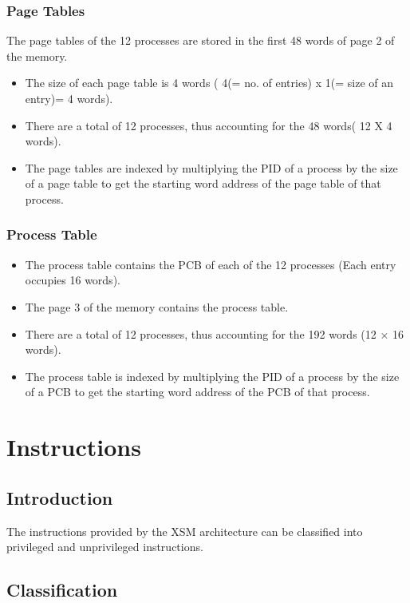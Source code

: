 \documentclass[11pt]{article}
\begin{document}
\subsubsection{Page Tables}
The page tables of the 12 processes are stored in the first 48 words of page 2 of the memory. 
\begin{itemize}
\item The size of each page table is 4 words ( 4(= no. of entries) x 1(= size of an entry)= 4 words).
\item There are a total of 12 processes, thus accounting for the 48 words( 12 X 4 words).
\item The page tables are indexed by multiplying the PID of a process by the size of a page table to get the starting word address of the page table of that process.
\end{itemize}

\subsubsection{Process Table}
\begin{itemize}
\item The process table contains the PCB of each of the 12 processes (Each entry occupies 16 words).
\item The page 3 of the memory contains the process table.
\item There are a total of 12 processes, thus accounting for the 192 words (12 × 16 words).
\item The process table is indexed by multiplying the PID of a process by the size of a PCB to get the starting word address of the PCB of that process.
\end{itemize}



\section{Instructions}

\subsection{Introduction}
The instructions provided by the XSM architecture can be classified into privileged and unprivileged instructions.

\subsection{Classification}
\end{document}
